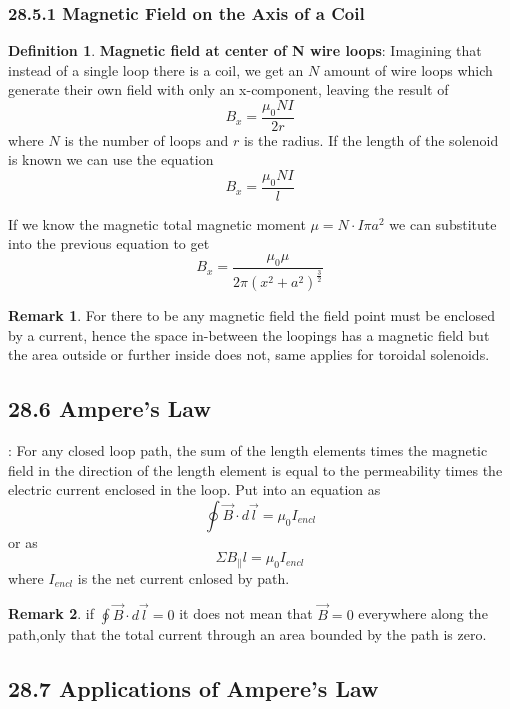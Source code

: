 \documentclass[12pt]{amsart}
\theoremstyle{definition}
\newtheorem{definition}{Definition} %
\newtheorem*{remark}{Remark}        %
\numberwithin{equation}{theorem}    %
\begin{document}
\subsubsection*{28.5.1 Magnetic Field on the Axis of a Coil}

\begin{definition}
    \textbf{Magnetic field at center of N wire loops}:
    Imagining that instead of a single loop there is a coil, we get an $N$ amount of wire loops which generate their own field with only an x-component, leaving the result of $$B_x = \frac{\mu_0NI}{2r}$$
    where $N$ is the number of loops and $r$ is the radius. 
    If the length of the solenoid is known we can use the equation
    $$B_x =\frac{\mu_0NI}{l}$$
    
    If we know the magnetic total magnetic moment $\mu = N\cdot I\pi a^2$ we can substitute into the previous equation to get 
    $$B_x = \frac{\mu_0 \mu}{2\pi(x^2+a^2)^{\frac{3}{2}}} $$

    \begin{remark}
        For there to be any magnetic field the field point must be enclosed by a current, hence the space in-between the loopings has a magnetic field but the area outside or further inside does not, same applies for toroidal solenoids.
    \end{remark}
\end{definition}

\subsection*{28.6 Ampere's Law}:
For any closed loop path, the sum of the length elements times the magnetic field in the direction of the length element is equal to the permeability times the electric current enclosed in the loop. Put into an equation as 
$$\oint\vec{B} \cdot d\vec{l} = \mu_0I_{encl}$$ or as $$\Sigma B_\parallel l = \mu_0I_{encl}$$ where $I_{encl}$ is the net current cnlosed by path.

\begin{remark}
    if $\oint\vec{B} \cdot d\vec{l} = 0$ it does not mean that $\vec{B} = 0$  everywhere along the path,only that the total current through an area bounded by the path is zero.
\end{remark}

\subsection*{28.7 Applications of Ampere's Law}
\end{document}

